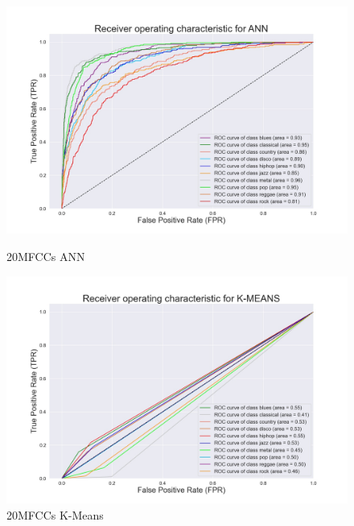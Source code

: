 \documentclass[conference]{IEEEtran}
\begin{document}
\begin{figure}[!ht]
\begin{center}
\begin{minipage}[t]{.24\textwidth}
        \end{minipage}
        \begin{minipage}[t]{.24\textwidth}
            \centering
            \includegraphics[width=\textwidth]{plot/SL/frequency_features/20/ANN_20MFCC_10000_10GEN_GTZAN - ROC Plot.jpg}
            \caption{20MFCCs ANN}
            \label{fig:20MFCCs ANN Frequency Features}
        \end{minipage}
        \begin{minipage}[t]{.24\textwidth}
            \centering
            \includegraphics[width=\textwidth]{plot/UL/frequency_features/20/20MFCC_10000_10GEN_GTZAN - ROC Plot.jpg}
            \caption{20MFCCs K-Means}
            \label{fig:20MFCCs K-Means Frequency Features}
        \end{minipage}
    \end{center}
\end{figure}
\end{document}
